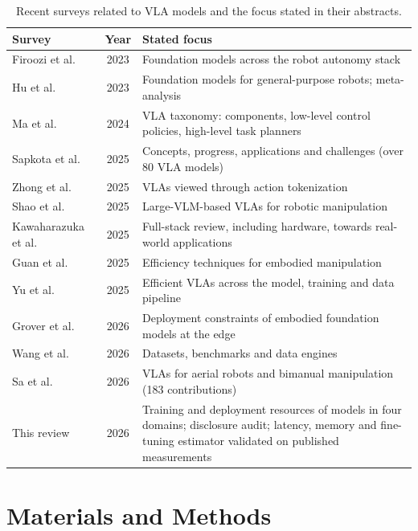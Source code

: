 \documentclass[applsci,review,submit,pdftex,oneauthor]{Definitions/mdpi}
\begin{document}
\begin{table}[H]
\caption{Recent surveys related to VLA models and the focus stated in their abstracts.\label{tab:surveys}}
\small
\begin{tabularx}{\textwidth}{@{}l c X@{}}
\toprule
\textbf{Survey} & \textbf{Year} & \textbf{Stated focus}\\
\midrule
Firoozi et al.~\cite{firoozi2023} & 2023 & Foundation models across the robot autonomy stack\\
Hu et al.~\cite{hu2023toward} & 2023 & Foundation models for general-purpose robots; meta-analysis\\
Ma et al.~\cite{ma2024survey} & 2024 & VLA taxonomy: components, low-level control policies, high-level task planners\\
Sapkota et al.~\cite{sapkota2025} & 2025 & Concepts, progress, applications and challenges (over 80 VLA models)\\
Zhong et al.~\cite{zhong2025token} & 2025 & VLAs viewed through action tokenization\\
Shao et al.~\cite{shao2025} & 2025 & Large-VLM-based VLAs for robotic manipulation\\
Kawaharazuka et al.~\cite{kawaharazuka2025vla} & 2025 & Full-stack review, including hardware, towards real-world applications\\
Guan et al.~\cite{guan2025efficient} & 2025 & Efficiency techniques for embodied manipulation\\
Yu et al.~\cite{yu2025efficient} & 2025 & Efficient VLAs across the model, training and data pipeline\\
Grover et al.~\cite{grover2026edge} & 2026 & Deployment constraints of embodied foundation models at the edge\\
Wang et al.~\cite{wang2026data} & 2026 & Datasets, benchmarks and data engines\\
Sa et al.~\cite{sa2026drones} & 2026 & VLAs for aerial robots and bimanual manipulation (183 contributions)\\
\midrule
This review & 2026 & Training and deployment resources of \nModels{} models in four domains; disclosure audit; latency, memory and fine-tuning estimator validated on published measurements\\
\bottomrule
\end{tabularx}
\end{table}

\section{Materials and Methods}\label{sec:methods}
\end{document}
